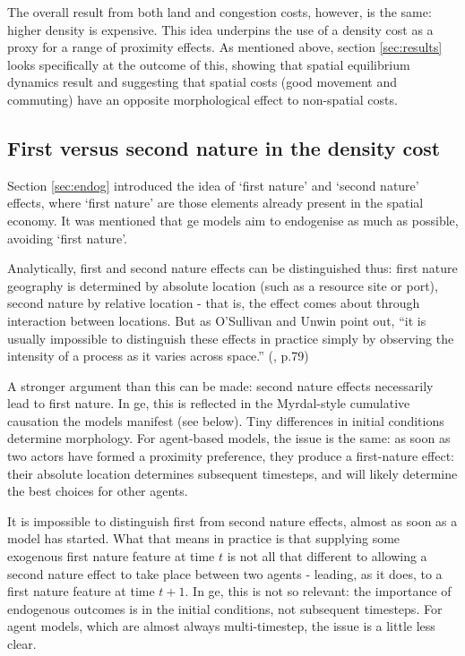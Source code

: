 {The overall result from both land and congestion costs, however, is the same: higher density is expensive. This idea underpins the use of a density cost as a proxy for a range of proximity effects. As mentioned above, section \ref{sec:results} looks specifically at the outcome of this, showing that spatial equilibrium dynamics result and suggesting that spatial costs (good movement and commuting) have an opposite morphological effect to non-spatial costs.

\subsection{First versus second nature in the density cost \label{sec:1st2ndnature}}

Section \ref{sec:endog} introduced the idea of `first nature' and `second nature' effects, where `first nature' are those elements already present in the spatial economy. It was mentioned that \gls{ge} models aim to endogenise as much as possible, avoiding `first nature'. 

Analytically, first and second nature effects can be distinguished thus: first nature geography is determined by absolute location (such as a resource site or port), second nature by relative location - that is, the effect comes about through interaction between locations. But as O'Sullivan and Unwin point out, ``it is usually impossible to distinguish these effects in practice simply by observing the intensity of a process as it varies across space.'' (\citealt{osullivan_geographic_2002}, p.79) 

A stronger argument than this can be made: second nature effects necessarily lead to first nature. In \gls{ge}, this is reflected in the Myrdal-style cumulative causation the models manifest (see below). Tiny differences in initial conditions determine morphology. For agent-based models, the issue is the same: as soon as two actors have formed a proximity preference, they produce a first-nature effect: their absolute location determines subsequent timesteps, and will likely determine the best choices for other agents. 

It is impossible to distinguish first from second nature effects, almost as soon as a model has started. What that means in practice is that supplying some exogenous first nature feature at time $t$ is not all that different to allowing a second nature effect to take place between two agents -  leading, as it does, to a first nature feature at time $t+1$. In \gls{ge}, this is not so relevant: the importance of endogenous outcomes is in the initial conditions, not subsequent timesteps. For agent models, which are almost always multi-timestep, the issue is a little less clear. 

}
